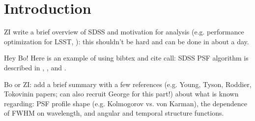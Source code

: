 \documentclass[12pt,preprint]{aastex}
\begin{document}




\section{Introduction}



ZI write a brief overview of SDSS and motivation for analysis (e.g. performance optimization
for LSST, \citealt{LSSToverview}): this shouldn't be hard and can be done in about a day. 

Hey Bo! Here is an example of using bibtex and cite call: SDSS PSF algorithm is described 
in \cite{Lupton2001}, \cite{Lupton2002}, and \citet[][see \S4.3]{SDSSEDR}.

Bo or ZI: add a brief summary with a few references (e.g. Young, Tyson, Roddier,
Tokovinin papers; can also recruit George for this part!) about what is known 
regarding:  PSF profile shape (e.g. Kolmogorov vs. von Karman), 
the dependence of FWHM on wavelength, and angular and temporal 
structure functions. 
\end{document}
